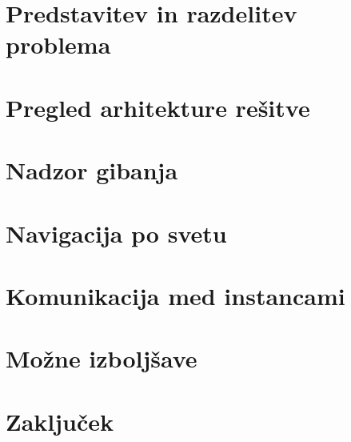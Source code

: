 \documentclass[a4paper,10pt]{article}
\begin{document}


\section{Predstavitev in razdelitev problema}

\section{Pregled arhitekture rešitve}

\section{Nadzor gibanja}

\section{Navigacija po svetu}

\section{Komunikacija med instancami}

\section{Možne izboljšave}

\section{Zaključek}
\end{document}

